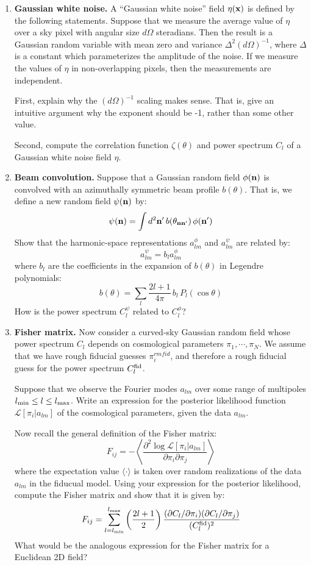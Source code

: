 \documentclass[aps,prd,superscriptaddress,groupedaddress,nofootinbib,nobibnotes]{revtex4}
\newcommand{\be}{\begin{equation}}
\newcommand{\ee}{\end{equation}}
\def\x{{\bf x}}
\def\L{{\mathcal L}}
\def\n{{\bf n}}
\begin{document}
\begin{enumerate}
\item {\bf Gaussian white noise.}
 A ``Gaussian white noise'' field $\eta(\x)$ is defined by the following statements.  Suppose that we
 measure the average value of $\eta$ over a sky pixel with angular size $d\Omega$ steradians.
 Then the result is a Gaussian random variable with mean zero and variance $\Delta^2 (d\Omega)^{-1}$,
 where $\Delta$ is a constant which parameterizes the amplitude of the noise.
 If we measure the values of $\eta$ in non-overlapping pixels, then the measurements are independent.

 First, explain why the $(d\Omega)^{-1}$ scaling makes sense.  That is, give an intuitive argument
 why the exponent should be -1, rather than some other value.

 Second, compute the correlation function $\zeta(\theta)$ and power spectrum $C_l$ of a Gaussian
 white noise field $\eta$.

\item {\bf Beam convolution.}
 Suppose that a Gaussian random field $\phi(\n)$ is convolved with an azimuthally symmetric beam profile $b(\theta)$.
 That is, we define a new random field $\psi(\n)$ by:
\be
 \psi(\n) = \int d^2\n' \, b(\theta_{\n\n'}) \, \phi(\n')
\ee
 Show that the harmonic-space representations $a_{lm}^\phi$ and $a_{lm}^\psi$ are related by:
\be
 a_{lm}^\psi = b_l a_{lm}^\phi
\ee
 where $b_l$ are the coefficients in the expansion of $b(\theta)$ in Legendre polynomials:
\be
 b(\theta) = \sum_l \frac{2l+1}{4\pi} \, b_l \, P_l(\cos\theta)
\ee
 How is the power spectrum $C_l^\psi$ related to $C_l^\phi$?

\item {\bf Fisher matrix.}
 Now consider a curved-sky Gaussian random field whose power spectrum $C_l$ depends on cosmological
 parameters $\pi_1, \cdots, \pi_N$.  We assume that we have rough fiducial guesses $\pi_i^{rm fid}$,
 and therefore a rough fiducial guess for the power spectrum $C_l^{\rm fid}$.

 Suppose that we observe the Fourier modes $a_{lm}$ over some range of multipoles $l_{\rm min} \le l \le l_{\rm max}$.
 Write an expression for the posterior likelihood function $\L[\pi_i|a_{lm}]$ of the cosmological parameters,
 given the data $a_{lm}$.

 Now recall the general definition of the Fisher matrix:
\be
 F_{ij} = -\left\langle \frac{\partial^2\log\L[\pi_i|a_{lm}]}{\partial\pi_i \partial\pi_j} \right\rangle
\ee
 where the expectation value $\langle \cdot \rangle$ is taken over random realizations of the data $a_{lm}$
 in the fiducual model.  Using your expression for the posterior likelihood, compute the Fisher matrix and
 show that it is given by:
\be
 F_{ij} = \sum_{l=l_{\rm min}}^{l_{\rm max}} \left( \frac{2l+1}{2} \right) \frac{(\partial C_l / \partial\pi_i)(\partial C_l/\partial\pi_j)}{(C_l^{\rm fid})^2}  \label{eq:F_C}
\ee
 What would be the analogous expression for the Fisher matrix for a Euclidean 2D field?


\end{enumerate}
\end{document}
